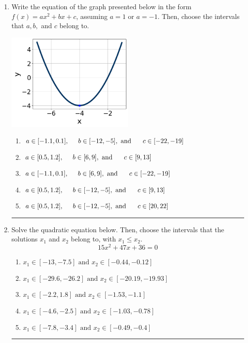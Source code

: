 \documentclass[14pt]{extbook}
\newcommand{\litem}[1]{\item#1\hspace*{-1cm}\rule{\textwidth}{0.4pt}}
\begin{document}
\begin{enumerate}
{\begin{enumerate}[label=\Alph*.]
\end{enumerate} }
\litem{
Write the equation of the graph presented below in the form $f(x)=ax^2+bx+c$, assuming  $a=1$ or $a=-1$. Then, choose the intervals that $a, b,$ and $c$ belong to.
\begin{center}
    \includegraphics[width=0.5\textwidth]{../Figures/quadraticGraphToEquationC.png}
\end{center}
\begin{enumerate}[label=\Alph*.]
\item \( a \in [-1.1, 0.1], \hspace*{5mm} b \in [-12, -5], \text{ and } \hspace*{5mm} c \in [-22, -19] \)
\item \( a \in [0.5, 1.2], \hspace*{5mm} b \in [6, 9], \text{ and } \hspace*{5mm} c \in [9, 13] \)
\item \( a \in [-1.1, 0.1], \hspace*{5mm} b \in [6, 9], \text{ and } \hspace*{5mm} c \in [-22, -19] \)
\item \( a \in [0.5, 1.2], \hspace*{5mm} b \in [-12, -5], \text{ and } \hspace*{5mm} c \in [9, 13] \)
\item \( a \in [0.5, 1.2], \hspace*{5mm} b \in [-12, -5], \text{ and } \hspace*{5mm} c \in [20, 22] \)

\end{enumerate} }
\litem{
Solve the quadratic equation below. Then, choose the intervals that the solutions $x_1$ and $x_2$ belong to, with $x_1 \leq x_2$.\[ 15x^{2} +47 x + 36 = 0 \]\begin{enumerate}[label=\Alph*.]
\item \( x_1 \in [-13, -7.5] \text{ and } x_2 \in [-0.44, -0.12] \)
\item \( x_1 \in [-29.6, -26.2] \text{ and } x_2 \in [-20.19, -19.93] \)
\item \( x_1 \in [-2.2, 1.8] \text{ and } x_2 \in [-1.53, -1.1] \)
\item \( x_1 \in [-4.6, -2.5] \text{ and } x_2 \in [-1.03, -0.78] \)
\item \( x_1 \in [-7.8, -3.4] \text{ and } x_2 \in [-0.49, -0.4] \)


\end{enumerate}}
\end{enumerate}
\end{document}
